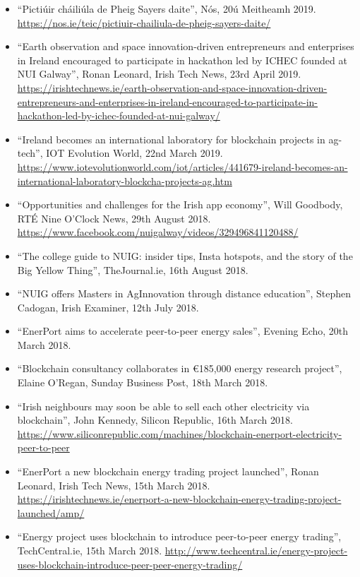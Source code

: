 \documentclass[10pt,a4paper]{res} %
\begin{document}
\begin{resume}
{\begin{itemize}
\item ``Picti\'{u}ir ch\'{a}ili\'{u}la de Pheig Sayers daite'', N\'{o}s, 20\'{u} Meitheamh 2019. \url{https://nos.ie/teic/pictiuir-chailiula-de-pheig-sayers-daite/}
\item ``Earth observation and space innovation-driven entrepreneurs and enterprises in Ireland encouraged to participate in hackathon led by ICHEC founded at NUI Galway'', Ronan Leonard, Irish Tech News, 23rd April 2019. \url{https://irishtechnews.ie/earth-observation-and-space-innovation-driven-entrepreneurs-and-enterprises-in-ireland-encouraged-to-participate-in-hackathon-led-by-ichec-founded-at-nui-galway/}
\item ``Ireland becomes an international laboratory for blockchain projects in ag-tech'', IOT Evolution World, 22nd March 2019. \url{https://www.iotevolutionworld.com/iot/articles/441679-ireland-becomes-an-international-laboratory-blockcha-projects-ag.htm}
\item ``Opportunities and challenges for the Irish app economy'', Will Goodbody, RT\'{E} Nine O'Clock News, 29th August 2018. \url{https://www.facebook.com/nuigalway/videos/329496841120488/}
\item ``The college guide to NUIG: insider tips, Insta hotspots, and the story of the Big Yellow Thing'', TheJournal.ie, 16th August 2018.
\item ``NUIG offers Masters in AgInnovation through distance education'', Stephen Cadogan, Irish Examiner, 12th July 2018.
\item ``EnerPort aims to accelerate peer-to-peer energy sales'', Evening Echo, 20th March 2018.
\item ``Blockchain consultancy collaborates in \euro{}185,000 energy research project'', Elaine O'Regan, Sunday Business Post, 18th March 2018.
\item ``Irish neighbours may soon be able to sell each other electricity via blockchain'', John Kennedy, Silicon Republic, 16th March 2018. \url{https://www.siliconrepublic.com/machines/blockchain-enerport-electricity-peer-to-peer}
\item ``EnerPort a new blockchain energy trading project launched'', Ronan Leonard, Irish Tech News, 15th March 2018. \url{https://irishtechnews.ie/enerport-a-new-blockchain-energy-trading-project-launched/amp/}
\item ``Energy project uses blockchain to introduce peer-to-peer energy trading'', TechCentral.ie, 15th March 2018. \url{http://www.techcentral.ie/energy-project-uses-blockchain-introduce-peer-peer-energy-trading/}

\end{itemize}}
\end{resume}
\end{document}

